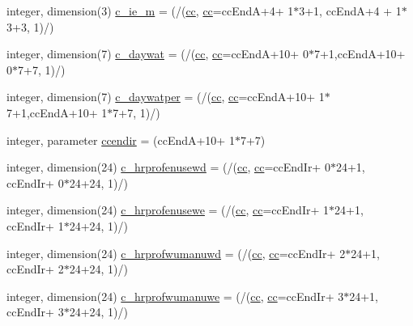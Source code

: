 \begin{DoxyCompactItemize}
\item 
integer, dimension(3) \hyperlink{namespaceallocatearray_a3f96e74f855b27cc4f66bac31735ba2b}{c\+\_\+ie\+\_\+m} = (/(\hyperlink{namespaceallocatearray_ac863c81704eb507dee10f5e10741e10c}{cc}, \hyperlink{namespaceallocatearray_ac863c81704eb507dee10f5e10741e10c}{cc}=cc\+EndA+4+ 1$\ast$3+1, cc\+EndA+4 + 1$\ast$3+3, 1)/)
\item 
integer, dimension(7) \hyperlink{namespaceallocatearray_a5740982b90c4175594f06cec32d0c8d7}{c\+\_\+daywat} = (/(\hyperlink{namespaceallocatearray_ac863c81704eb507dee10f5e10741e10c}{cc}, \hyperlink{namespaceallocatearray_ac863c81704eb507dee10f5e10741e10c}{cc}=cc\+EndA+10+ 0$\ast$7+1,cc\+EndA+10+ 0$\ast$7+7, 1)/)
\item 
integer, dimension(7) \hyperlink{namespaceallocatearray_a3222aa35653c2b388e922ec6f5dde9f1}{c\+\_\+daywatper} = (/(\hyperlink{namespaceallocatearray_ac863c81704eb507dee10f5e10741e10c}{cc}, \hyperlink{namespaceallocatearray_ac863c81704eb507dee10f5e10741e10c}{cc}=cc\+EndA+10+ 1$\ast$7+1,cc\+EndA+10+ 1$\ast$7+7, 1)/)
\item 
integer, parameter \hyperlink{namespaceallocatearray_a1e276529754e8a86220ffbb33ed42104}{ccendir} = (cc\+EndA+10+ 1$\ast$7+7)
\item 
integer, dimension(24) \hyperlink{namespaceallocatearray_af7360c52bc2192621d817bdbc4d60a9c}{c\+\_\+hrprofenusewd} = (/(\hyperlink{namespaceallocatearray_ac863c81704eb507dee10f5e10741e10c}{cc}, \hyperlink{namespaceallocatearray_ac863c81704eb507dee10f5e10741e10c}{cc}=cc\+End\+Ir+ 0$\ast$24+1, cc\+End\+Ir+ 0$\ast$24+24, 1)/)
\item 
integer, dimension(24) \hyperlink{namespaceallocatearray_a318c5a0cfc33bb9e3dcfa2eb8f18efec}{c\+\_\+hrprofenusewe} = (/(\hyperlink{namespaceallocatearray_ac863c81704eb507dee10f5e10741e10c}{cc}, \hyperlink{namespaceallocatearray_ac863c81704eb507dee10f5e10741e10c}{cc}=cc\+End\+Ir+ 1$\ast$24+1, cc\+End\+Ir+ 1$\ast$24+24, 1)/)
\item 
integer, dimension(24) \hyperlink{namespaceallocatearray_aa110accf8ca7f9ce8f65084bb3dfaf2d}{c\+\_\+hrprofwumanuwd} = (/(\hyperlink{namespaceallocatearray_ac863c81704eb507dee10f5e10741e10c}{cc}, \hyperlink{namespaceallocatearray_ac863c81704eb507dee10f5e10741e10c}{cc}=cc\+End\+Ir+ 2$\ast$24+1, cc\+End\+Ir+ 2$\ast$24+24, 1)/)
\item 
integer, dimension(24) \hyperlink{namespaceallocatearray_a8c6488d8e54bce9b139d4a7a755da8aa}{c\+\_\+hrprofwumanuwe} = (/(\hyperlink{namespaceallocatearray_ac863c81704eb507dee10f5e10741e10c}{cc}, \hyperlink{namespaceallocatearray_ac863c81704eb507dee10f5e10741e10c}{cc}=cc\+End\+Ir+ 3$\ast$24+1, cc\+End\+Ir+ 3$\ast$24+24, 1)/)

\end{DoxyCompactItemize}
